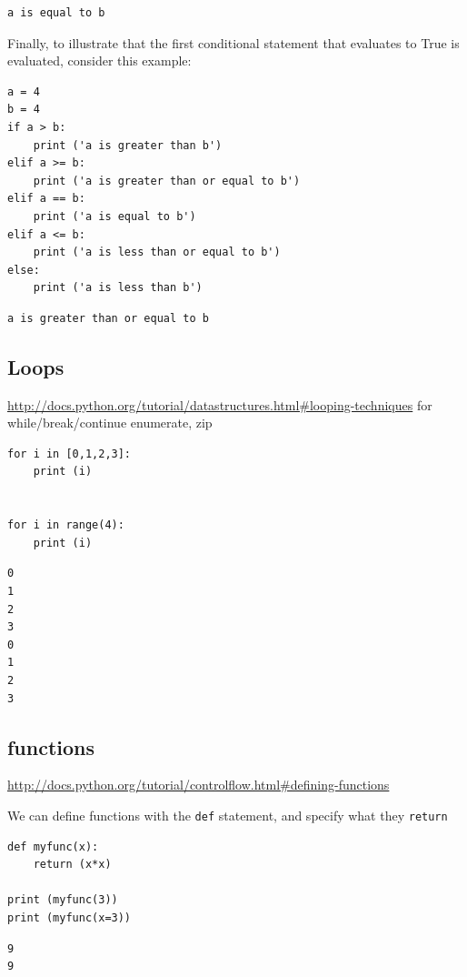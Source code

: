 \documentclass[11pt]{article}
\begin{document}
\begin{verbatim}
a is equal to b
\end{verbatim}

Finally, to illustrate that the first conditional statement that evaluates to True is evaluated, consider this example:
\begin{verbatim}
a = 4
b = 4
if a > b:
    print ('a is greater than b')
elif a >= b:
    print ('a is greater than or equal to b')
elif a == b:
    print ('a is equal to b')
elif a <= b:
    print ('a is less than or equal to b')
else:
    print ('a is less than b')
\end{verbatim}

\begin{verbatim}
a is greater than or equal to b
\end{verbatim}


\subsection{Loops}
\label{sec:org17c6c26}
\url{http://docs.python.org/tutorial/datastructures.html\#looping-techniques}
for
while/break/continue
enumerate, zip

\begin{verbatim}
for i in [0,1,2,3]:
    print (i)


for i in range(4):
    print (i)
\end{verbatim}

\begin{verbatim}
0
1
2
3
0
1
2
3
\end{verbatim}


\subsection{functions}
\label{sec:org19d928d}
\url{http://docs.python.org/tutorial/controlflow.html\#defining-functions}

We can define functions with the \texttt{def} statement, and specify what they \texttt{return}
\begin{verbatim}
def myfunc(x):
    return (x*x)

print (myfunc(3))
print (myfunc(x=3))
\end{verbatim}

\begin{verbatim}
9
9
\end{verbatim}
\end{document}
